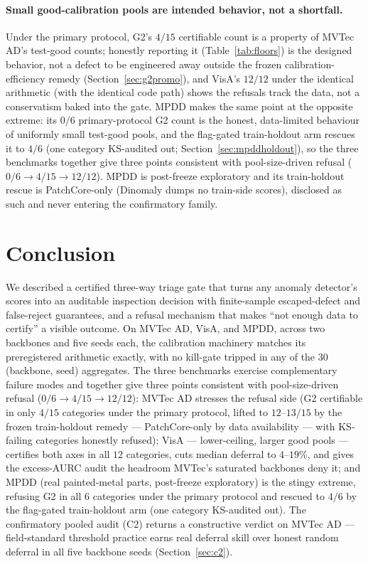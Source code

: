 \documentclass[11pt]{article}
\begin{document}
\paragraph{Small good-calibration pools are intended behavior, not a shortfall.} Under the primary
protocol, G2's $4/15$ certifiable count is a property of MVTec AD's test-good counts; honestly
reporting it (Table~\ref{tab:floors}) is the designed behavior, not a defect to be engineered
away outside the frozen calibration-efficiency remedy (Section~\ref{sec:g2promo}), and VisA's
$12/12$ under the identical arithmetic (with the identical code path) shows the refusals track
the data, not a conservatism baked into the gate. MPDD makes the same point at the opposite
extreme: its $0/6$ primary-protocol G2 count is the honest, data-limited behaviour of uniformly
small test-good pools, and the flag-gated train-holdout arm rescues it to $4/6$ (one category
KS-audited out; Section~\ref{sec:mpddholdout}), so the three benchmarks together give three points
consistent with pool-size-driven refusal ($0/6 \to 4/15 \to 12/12$). MPDD is
post-freeze exploratory and its train-holdout rescue is PatchCore-only (Dinomaly dumps no
train-side scores), disclosed as such and never entering the confirmatory family.

\section{Conclusion}
\label{sec:conclusion}

We described a certified three-way triage gate that turns any anomaly detector's scores into an
auditable inspection decision with finite-sample escaped-defect and false-reject guarantees, and a
refusal mechanism that makes ``not enough data to certify'' a visible outcome. On MVTec AD,
VisA, and MPDD, across two backbones and five seeds each, the calibration machinery matches its
preregistered arithmetic exactly, with no kill-gate tripped in any of the $30$ (backbone, seed)
aggregates. The three benchmarks exercise complementary failure modes and together give three
points consistent with pool-size-driven refusal ($0/6 \to 4/15 \to 12/12$): MVTec AD
stresses the refusal side (G2 certifiable in only $4/15$ categories under the primary protocol,
lifted to $12$--$13/15$ by the frozen train-holdout remedy --- PatchCore-only by data availability
--- with KS-failing categories honestly refused);
VisA --- lower-ceiling, larger good pools --- certifies both axes in all $12$ categories,
cuts median deferral to $4$--$19\%$, and gives the excess-AURC audit the headroom MVTec's
saturated backbones deny it; and MPDD (real painted-metal parts, post-freeze exploratory) is the
stingy extreme, refusing G2 in all $6$ categories under the primary protocol and rescued to $4/6$
by the flag-gated train-holdout arm (one category KS-audited out). The confirmatory pooled audit
(C2) returns a constructive verdict on
MVTec AD --- field-standard threshold practice earns real deferral skill over honest random deferral
in all five backbone seeds (Section~\ref{sec:c2}).
\end{document}
